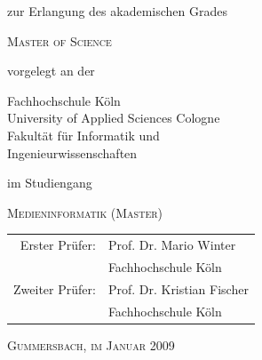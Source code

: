 \begin{titlepage}
\begin{center}
zur Erlangung des akademischen Grades\\
\begin{large}
\textsc{Master of Science}\\ 
\end{large}

\vspace{0.4cm}

vorgelegt an der\\ 
\begin{large}
\begin{scshape}
Fachhochschule Köln\\
University of Applied Sciences Cologne\\
Fakultät für Informatik und\\
Ingenieurwissenschaften\\
\end{scshape}
\end{large}

\vspace{0.4cm}

\vspace{0.2cm}
im Studiengang\\ 
\begin{large}
\textsc{Medieninformatik (Master)}
\end{large}

\vspace{0.7cm}

\begin{tabular}{rl}
         Erster Prüfer: &  Prof. Dr. Mario Winter\\
       							    &  \small Fachhochschule Köln \\[1.0em]
        Zweiter Prüfer: &  Prof. Dr. Kristian Fischer\\
       							    &  \small Fachhochschule Köln \\
\end{tabular}

\vspace{0.5cm}

\textsc{Gummersbach, im Januar 2009}

\end{center}


\end{titlepage}
